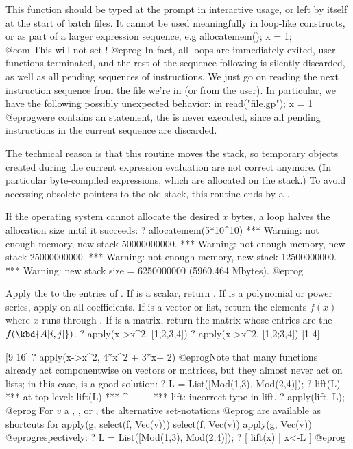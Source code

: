  This function should be typed at the  prompt in
interactive usage, or left by itself at the start of batch files.
It cannot be used meaningfully in loop-like constructs, or as part of a
larger expression sequence, e.g
\bprog
   allocatemem(); x = 1;   \\@com This will not set !
@eprog\noindent
In fact, all loops are immediately exited, user functions terminated, and
the rest of the sequence following  is silently
discarded, as well as all pending sequences of instructions. We just go on
reading the next instruction sequence from the file we're in (or from the
user). In particular, we have the following possibly unexpected behavior: in
\bprog
   read("file.gp"); x = 1
@eprog\noindent were  contains an  statement,
the  is never executed, since all pending instructions in the
current sequence are discarded.

The technical reason is that this routine moves the stack, so temporary
objects created during the current expression evaluation are not correct
anymore. (In particular byte-compiled expressions, which are allocated on
the stack.) To avoid accessing obsolete pointers to the old stack, this
routine ends by a .

 If the operating system cannot allocate the desired
$x$ bytes, a loop halves the allocation size until it succeeds:
\bprog
? allocatemem(5*10^10)
 ***   Warning: not enough memory, new stack 50000000000.
 ***   Warning: not enough memory, new stack 25000000000.
 ***   Warning: not enough memory, new stack 12500000000.
 ***   Warning: new stack size = 6250000000 (5960.464 Mbytes).
@eprog

\label{se:apply}
Apply the   to the entries of . If 
is a scalar, return . If  is a polynomial or power series,
apply  on all coefficients. If  is a vector or list, return
the elements $f(x)$ where $x$ runs through . If  is a matrix,
return the matrix whose entries are the $f(\kbd{A[i,j]})$.
\bprog
? apply(x->x^2, [1,2,3,4])
? apply(x->x^2, [1,2;3,4])
[1 4]

[9 16]
? apply(x->x^2, 4*x^2 + 3*x+ 2)
@eprog\noindent Note that many functions already act componentwise on
vectors or matrices, but they almost never act on lists; in this
case,  is a good solution:
\bprog
? L = List([Mod(1,3), Mod(2,4)]);
? lift(L)
  ***   at top-level: lift(L)
  ***                 ^-------
  *** lift: incorrect type in lift.
? apply(lift, L);
@eprog
 For $v$ a , ,  or ,
the alternative set-notations
\bprog
[g(x) | x <- v, f(x)]
[x | x <- v, f(x)]
[g(x) | x <- v]
@eprog\noindent
are available as shortcuts for
\bprog
apply(g, select(f, Vec(v)))
select(f, Vec(v))
apply(g, Vec(v))
@eprog\noindent respectively:
\bprog
? L = List([Mod(1,3), Mod(2,4)]);
? [ lift(x) | x<-L ]
@eprog

